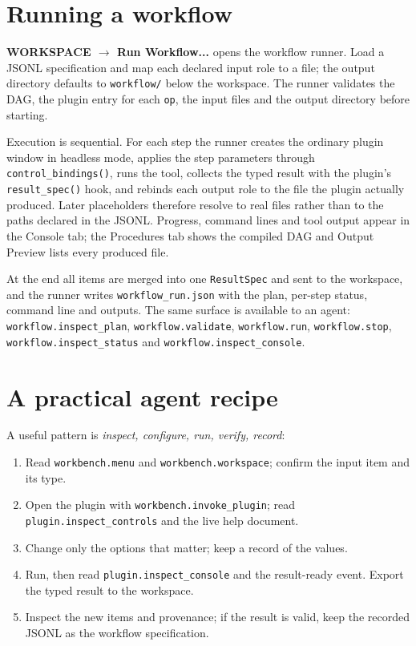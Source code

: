 \documentclass[10pt]{report}
\begin{document}
\section{Running a workflow}

\textbf{WORKSPACE $\rightarrow$ Run Workflow...} opens the workflow runner.
Load a JSONL specification and map each declared input role to a file; the
output directory defaults to \texttt{workflow/} below the workspace. The
runner validates the DAG, the plugin entry for each \texttt{op}, the input
files and the output directory before starting.

Execution is sequential. For each step the runner creates the ordinary plugin
window in headless mode, applies the step parameters through
\texttt{control\_bindings()}, runs the tool, collects the typed result with the
plugin's \texttt{result\_spec()} hook, and rebinds each output role to the file
the plugin actually produced. Later placeholders therefore resolve to real
files rather than to the paths declared in the JSONL. Progress, command lines
and tool output appear in the Console tab; the Procedures tab shows the
compiled DAG and Output Preview lists every produced file.

At the end all items are merged into one \texttt{ResultSpec} and sent to the
workspace, and the runner writes \texttt{workflow\_run.json} with the plan,
per-step status, command line and outputs. The same surface is available to an
agent: \texttt{workflow.inspect\_plan}, \texttt{workflow.validate},
\texttt{workflow.run}, \texttt{workflow.stop},
\texttt{workflow.inspect\_status} and \texttt{workflow.inspect\_console}.

\section{A practical agent recipe}

A useful pattern is \emph{inspect, configure, run, verify, record}:

\begin{enumerate}
  \item Read \texttt{workbench.menu} and \texttt{workbench.workspace}; confirm
        the input item and its type.
  \item Open the plugin with \texttt{workbench.invoke\_plugin}; read
        \texttt{plugin.inspect\_controls} and the live help document.
  \item Change only the options that matter; keep a record of the values.
  \item Run, then read \texttt{plugin.inspect\_console} and the result-ready
        event. Export the typed result to the workspace.
  \item Inspect the new items and provenance; if the result is valid, keep the
        recorded JSONL as the workflow specification.
\end{enumerate}
\end{document}
